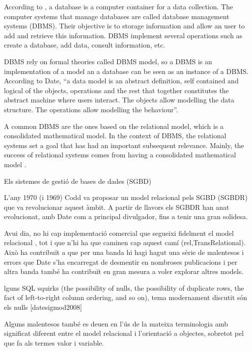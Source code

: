 According to \textcite{date}, a database is a computer container for a data collection. The computer systems that manage databases are called database management systems (DBMS). Their objective is to storage information and allow an user to add and retrieve this information. DBMS implement several operations such as create a database, add data, consult information, etc.

DBMS rely on formal theories called DBMS model, so a DBMS is an implementation of a model an a database can be seen as an instance of a DBMS. According to Date, ``a data model is an abstract definition, self contained and logical of the objects, operations and the rest that together constitutes the abstract machine where users interact. The objects allow modelling the data structure. The operations allow modelling the behaviour''.

A common DBMS are the ones based on the relational model, which is a consolidated mathematical model. In the context of DBMS, the relational systems set a goal that has had an important subsequent relevance. Mainly, the success of relational systems comes from having a consolidated mathematical model \parencite{date}.


Els sistemes de gestió de bases de dades (SGBD) 



L'any 1970 (i 1969) Codd va proposar un model relacional pels SGBD (SGBDR) que va revolucionar aquest àmbit. A partir de llavors els SGBDR han anat evolucionat, amb Date com a principal divulgador, fins a tenir una gran solidesa.

Avui dia, no hi cap implementació comercial que segueixi fidelment el model relacional , tot i que n'hi ha que caminen cap aquest camí (rel,TransRelational). Això ha contribuït a que per una banda hi hagi hagut una sèrie de malentesos i errors que Date s'ha encarregat de desmentir en nombroses publicacions  i per altra banda també ha contribuït en gran mesura a voler explorar altres models.              


lguns SQL squirks (the possibility of nulls, the possibility of duplicate rows, the
fact of left-to-right column ordering, and so on), tema modernament discutit són els nulls [datesigmod2008]

Alguns malentesos també es deuen en l'ús de la mateixa terminologia amb significat diferent entre el model relacional i l'orientació a objectes, sobretot pel que fa als termes valor i variable. 

